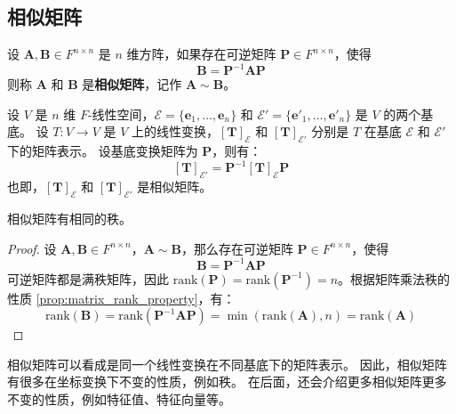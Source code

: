 \vspace{1em}

\subsection{相似矩阵}

\begin{definition}
    设 $\mathbf{A},\mathbf{B}\in F^{n\times n}$ 是 $n$ 维方阵，如果存在可逆矩阵 $\mathbf{P} \in F^{n\times n}$，使得
    \[
        \mathbf{B} = \mathbf{P}^{-1}\mathbf{A}\mathbf{P}
    \]
    则称 $\mathbf{A}$ 和 $\mathbf{B}$ 是\textbf{相似矩阵}，记作 $\mathbf{A} \sim \mathbf{B}$。
    \label{def:similar_matrices}
\end{definition}

\begin{proposition}[矩阵的坐标变换]
    设 $V$ 是 $n$ 维 $F$-线性空间，$\mathcal{E} = \{\mathbf{e}_1,\ldots,\mathbf{e}_n\}$ 和 $\mathcal{E}' = \{\mathbf{e}'_1,\ldots,\mathbf{e}'_n\}$ 是 $V$ 的两个基底。
    设 $T:V\to V$ 是 $V$ 上的线性变换，$[\mathbf{T}]_{\mathcal{E}}$ 和 $[\mathbf{T}]_{\mathcal{E}'}$ 分别是 $T$ 在基底 $\mathcal{E}$ 和 $\mathcal{E}'$ 下的矩阵表示。
    设基底变换矩阵为 $\mathbf{P}$，则有：
    \[
        [\mathbf{T}]_{\mathcal{E}'} = \mathbf{P}^{-1} [\mathbf{T}]_{\mathcal{E}} \mathbf{P}
    \]
    也即，$[\mathbf{T}]_{\mathcal{E}}$ 和 $[\mathbf{T}]_{\mathcal{E}'}$ 是相似矩阵。
    \label{prop:matrix_coordinate_transform}
\end{proposition}

\begin{proposition}
    相似矩阵有相同的秩。
    \label{prop:similar_matrices_have_same_rank}
\end{proposition}
\begin{proof}
    设 $\mathbf{A},\mathbf{B}\in F^{n\times n}$，$\mathbf{A} \sim \mathbf{B}$，那么存在可逆矩阵 $\mathbf{P} \in F^{n\times n}$，使得
    \[
        \mathbf{B} = \mathbf{P}^{-1}\mathbf{A}\mathbf{P}
    \]
    可逆矩阵都是满秩矩阵，因此 $\mathrm{rank}(\mathbf{P}) = \mathrm{rank}(\mathbf{P}^{-1})= n$。根据矩阵乘法秩的性质 \ref{prop:matrix_rank_property}，有：
    \[
        \mathrm{rank}(\mathbf{B}) = \mathrm{rank}(\mathbf{P}^{-1}\mathbf{A}\mathbf{P}) = \min(\mathrm{rank}(\mathbf{A}),n) = \mathrm{rank}(\mathbf{A})
    \]
\end{proof}

\begin{note}
    相似矩阵可以看成是同一个线性变换在不同基底下的矩阵表示。
    因此，相似矩阵有很多在坐标变换下不变的性质，例如秩。
    在后面，还会介绍更多相似矩阵更多不变的性质，例如特征值、特征向量等。
\end{note}

\newpage